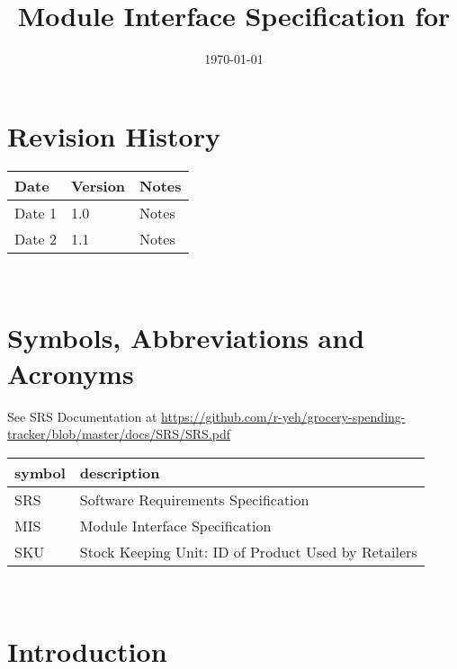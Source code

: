 \documentclass[12pt, titlepage]{article}
\begin{document}
\title{Module Interface Specification for \progname{}}

\author{\authname}

\date{\today}

\maketitle


\section{Revision History}

\begin{tabularx}{\textwidth}{p{3cm}p{2cm}X}
\toprule {\bf Date} & {\bf Version} & {\bf Notes}\\
\midrule
Date 1 & 1.0 & Notes\\
Date 2 & 1.1 & Notes\\
\bottomrule
\end{tabularx}

~\newpage

\section{Symbols, Abbreviations and Acronyms}

See SRS Documentation at \url{https://github.com/r-yeh/grocery-spending-tracker/blob/master/docs/SRS/SRS.pdf}
\newline
\renewcommand{\arraystretch}{1.2}
\begin{tabular}{l l} 
  \toprule		
  \textbf{symbol} & \textbf{description}\\
  \midrule 
  SRS & Software Requirements Specification\\
  MIS & Module Interface Specification \\
  SKU & Stock Keeping Unit: ID of Product Used by Retailers \\
  \bottomrule
\end{tabular}\\

\newpage

\tableofcontents

\newpage


\section{Introduction}
\end{document}
